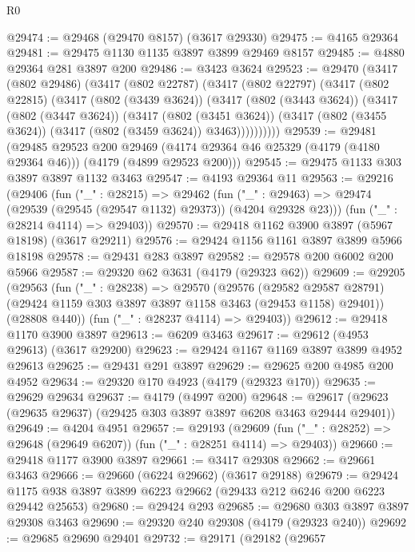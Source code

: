 \begin{lexlean}{R0}
\begin{coremodule}
@29474 := @29468 (@29470 @8157) (@3617 @29330)
@29475 := @4165 @29364
@29481 := @29475 @1130 @1135 @3897 @3899 @29469 @8157
@29485 := @4880 @29364 @281 @3897 @200
@29486 := @3423 @3624
@29523 := @29470
    (@3417
      (@802 @29486)
      (@3417
        (@802 @22787)
        (@3417
          (@802 @22797)
          (@3417
            (@802 @22815)
            (@3417
              (@802 (@3439 @3624))
              (@3417
                (@802 (@3443 @3624))
                (@3417
                  (@802 (@3447 @3624))
                  (@3417
                    (@802 (@3451 @3624))
                    (@3417 (@802 (@3455 @3624)) (@3417 (@802 (@3459 @3624)) @3463))))))))))
@29539 := @29481
    (@29485
      @29523
      @200
      @29469
      (@4174 @29364 @46 @25329 (@4179 (@4180 @29364 @46)))
      (@4179 (@4899 @29523 @200)))
@29545 := @29475 @1133 @303 @3897 @3897 @1132 @3463
@29547 := @4193 @29364 @11
@29563 := @29216
    (@29406
      (fun ("_" : @28215) =>
      @29462
        (fun ("_" : @29463) => @29474 (@29539 (@29545 (@29547 @1132) @29373)) (@4204 @29328 @23)))
      (fun ("_" : @28214 @4114) => @29403))
@29570 := @29418 @1162 @3900 @3897 (@5967 @18198) (@3617 @29211)
@29576 := @29424 @1156 @1161 @3897 @3899 @5966 @18198
@29578 := @29431 @283 @3897
@29582 := @29578 @200 @6002 @200 @5966
@29587 := @29320 @62 @3631 (@4179 (@29323 @62))
@29609 := @29205
    (@29563
      (fun ("_" : @28238) =>
      @29570
        (@29576
          (@29582 @29587 @28791)
          (@29424 @1159 @303 @3897 @3897 @1158 @3463 (@29453 @1158) @29401))
        (@28808 @440))
      (fun ("_" : @28237 @4114) => @29403))
@29612 := @29418 @1170 @3900 @3897
@29613 := @6209 @3463
@29617 := @29612 (@4953 @29613) (@3617 @29200)
@29623 := @29424 @1167 @1169 @3897 @3899 @4952 @29613
@29625 := @29431 @291 @3897
@29629 := @29625 @200 @4985 @200 @4952
@29634 := @29320 @170 @4923 (@4179 (@29323 @170))
@29635 := @29629 @29634
@29637 := @4179 (@4997 @200)
@29648 := @29617 (@29623 (@29635 @29637) (@29425 @303 @3897 @3897 @6208 @3463 @29444 @29401))
@29649 := @4204 @4951
@29657 := @29193
    (@29609 (fun ("_" : @28252) => @29648 (@29649 @6207)) (fun ("_" : @28251 @4114) => @29403))
@29660 := @29418 @1177 @3900 @3897
@29661 := @3417 @29308
@29662 := @29661 @3463
@29666 := @29660 (@6224 @29662) (@3617 @29188)
@29679 := @29424 @1175 @938 @3897 @3899 @6223 @29662 (@29433 @212 @6246 @200 @6223 @29442 @25653)
@29680 := @29424 @293
@29685 := @29680 @303 @3897 @3897 @29308 @3463
@29690 := @29320 @240 @29308 (@4179 (@29323 @240))
@29692 := @29685 @29690 @29401
@29732 := @29171
    (@29182
      (@29657

\end{coremodule}
\end{lexlean}
